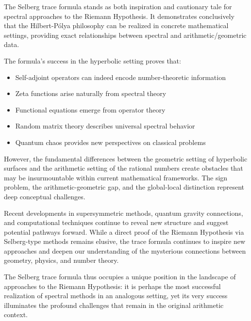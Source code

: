 The Selberg trace formula stands as both inspiration and cautionary tale for spectral approaches to the Riemann Hypothesis. It demonstrates conclusively that the Hilbert-Pólya philosophy can be realized in concrete mathematical settings, providing exact relationships between spectral and arithmetic/geometric data.

The formula's success in the hyperbolic setting proves that:
\begin{itemize}
\item Self-adjoint operators can indeed encode number-theoretic information
\item Zeta functions arise naturally from spectral theory
\item Functional equations emerge from operator theory
\item Random matrix theory describes universal spectral behavior
\item Quantum chaos provides new perspectives on classical problems
\end{itemize}

However, the fundamental differences between the geometric setting of hyperbolic surfaces and the arithmetic setting of the rational numbers create obstacles that may be insurmountable within current mathematical frameworks. The sign problem, the arithmetic-geometric gap, and the global-local distinction represent deep conceptual challenges.

Recent developments in supersymmetric methods, quantum gravity connections, and computational techniques continue to reveal new structure and suggest potential pathways forward. While a direct proof of the Riemann Hypothesis via Selberg-type methods remains elusive, the trace formula continues to inspire new approaches and deepen our understanding of the mysterious connections between geometry, physics, and number theory.

The Selberg trace formula thus occupies a unique position in the landscape of approaches to the Riemann Hypothesis: it is perhaps the most successful realization of spectral methods in an analogous setting, yet its very success illuminates the profound challenges that remain in the original arithmetic context.